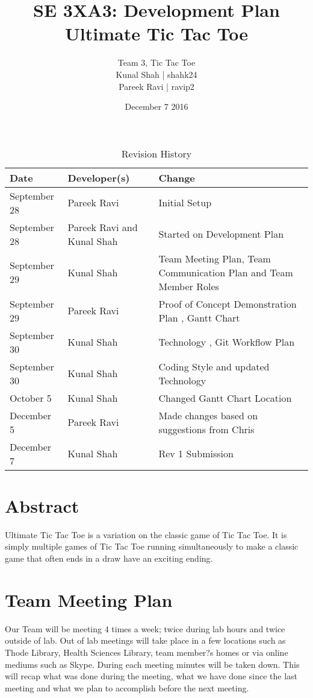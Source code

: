 \documentclass{article}
\title{SE 3XA3: Development Plan\\Ultimate Tic Tac Toe}
\author{Team 3, Tic Tac Toe
		\\ Kunal Shah | shahk24
		\\ Pareek Ravi | ravip2
}
\date{December 7 2016}
\begin{document}
\maketitle

\tableofcontents

\newpage

\begin{table}[hp]
\caption{Revision History} \label{TblRevisionHistory}
\begin{tabularx}{\textwidth}{llX}
\toprule
\textbf{Date} & \textbf{Developer(s)} & \textbf{Change}\\
\midrule
September 28 & Pareek Ravi & Initial Setup\\
September 28 & Pareek Ravi and Kunal Shah & Started on Development Plan\\
September 29 & Kunal Shah & Team Meeting Plan, Team Communication Plan and Team Member Roles\\
September 29 & Pareek Ravi & Proof of Concept Demonstration Plan , Gantt Chart\\
September 30 & Kunal Shah & Technology , Git Workflow Plan \\
September 30 & Kunal Shah & Coding Style and updated Technology\\
October 5 & Kunal Shah & Changed Gantt Chart Location\\
December 5 & Pareek Ravi & Made changes based on suggestions from Chris\\
December 7 & Kunal Shah & Rev 1 Submission\\

\bottomrule
\end{tabularx}
\end{table}
\newpage

\section*{Abstract}
Ultimate Tic Tac Toe is a variation on the classic game of Tic Tac Toe. It is 
simply multiple games of Tic Tac Toe running simultaneously to make a classic 
game that often ends in a draw have an exciting ending.

\section{Team Meeting Plan}
Our Team will be meeting 4 times a week; twice during lab hours and twice 
outside of lab. Out of lab meetings will take place in a few locations such as
Thode Library, Health Sciences Library, team member?s homes or via online 
 mediums such as Skype. During each meeting minutes will be taken down. 
 This will recap what was done during the meeting, what we have done since the 
last meeting and what we plan to accomplish before the next meeting.
\end{document}
